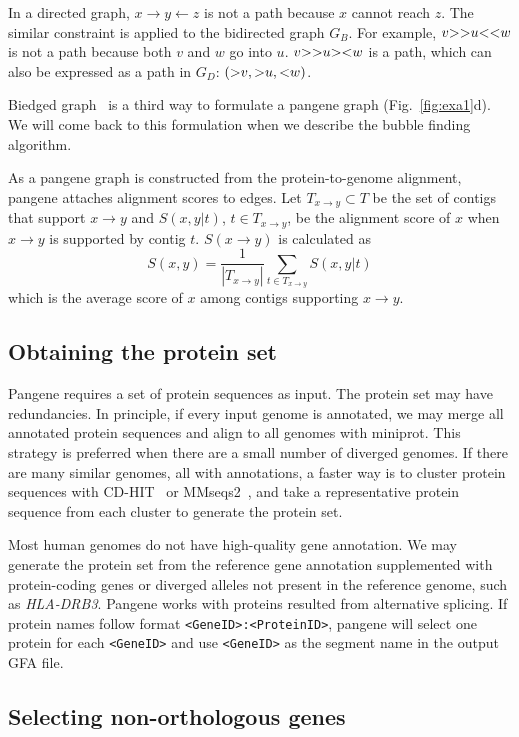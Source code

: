 \documentclass[webpdf,contemporary,large,namedate]{oup-authoring-template}%
\begin{document}
In a directed graph, $x\to y\gets z$ is not a path because $x$ cannot reach $z$.
The similar constraint is applied to the bidirected graph $G_B$.
For example, $v{\rm >>}u{\rm <<}w$ is not a path because both $v$ and $w$ go into $u$.
$v{\rm >>}u{\rm ><}w$ is a path, which can also be expressed as a path in $G_D$: $({\rm >}v,{\rm >}u,{\rm <}w)$.

Biedged graph~\citep{Paten:2018aa} is a third way to formulate a pangene graph (Fig.~\ref{fig:exa1}d).
We will come back to this formulation when we describe the bubble finding algorithm.

As a pangene graph is constructed from the protein-to-genome alignment,
pangene attaches alignment scores to edges.
Let $T_{x\to y}\subset T$ be the set of contigs that support $x\to y$
and $S(x,y|t)$, $t\in T_{x\to y}$, be the alignment score of $x$ when $x\to y$ is supported by contig $t$.
$S(x\to y)$ is calculated as
$$
S(x, y)=\frac{1}{|T_{x\to y}|}\sum_{t\in T_{x\to y}}S(x,y|t)
$$
which is the average score of $x$ among contigs supporting $x\to y$.

\subsection{Obtaining the protein set}

Pangene requires a set of protein sequences as input.
The protein set may have redundancies.
In principle, if every input genome is annotated, we may merge all annotated protein sequences
and align to all genomes with miniprot.
This strategy is preferred when there are a small number of diverged genomes.
If there are many similar genomes, all with annotations,
a faster way is to cluster protein sequences with CD-HIT~\citep{Li:2006aa} or MMseqs2~\citep{Schneider:2017aa},
and take a representative protein sequence from each cluster to generate the protein set.

Most human genomes do not have high-quality gene annotation.
We may generate the protein set from the reference gene annotation supplemented
with protein-coding genes or diverged alleles not present in the reference genome, such as \emph{HLA-DRB3}.
Pangene works with proteins resulted from alternative splicing.
If protein names follow format {\tt <GeneID>:<ProteinID>},
pangene will select one protein for each {\tt <GeneID>} and use {\tt <GeneID>} as the segment name in the output GFA file.

\subsection{Selecting non-orthologous genes}
\end{document}

